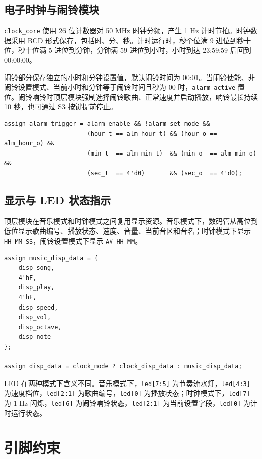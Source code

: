 \documentclass[UTF8,a4paper,12pt]{ctexart}
\begin{document}
\subsection{电子时钟与闹铃模块}

\verb|clock_core| 使用 26 位计数器对 50 MHz 时钟分频，产生 1 Hz 计时节拍。时钟数据采用 BCD 形式保存，包括时、分、秒。计时运行时，秒个位满 9 进位到秒十位，秒十位满 5 进位到分钟，分钟满 59 进位到小时，小时到达 23:59:59 后回到 00:00:00。

闹铃部分保存独立的小时和分钟设置值，默认闹铃时间为 00:01。当闹铃使能、非闹铃设置模式、当前小时和分钟等于闹铃时间且秒为 00 时，\verb|alarm_active| 置位。闹铃响铃时顶层模块强制选择闹铃歌曲、正常速度并启动播放，响铃最长持续 10 秒，也可通过 S3 按键提前停止。

\begin{lstlisting}[style=svstyle,caption={闹铃触发条件}]
assign alarm_trigger = alarm_enable && !alarm_set_mode &&
                       (hour_t == alm_hour_t) && (hour_o == alm_hour_o) &&
                       (min_t  == alm_min_t)  && (min_o  == alm_min_o)  &&
                       (sec_t  == 4'd0)       && (sec_o  == 4'd0);
\end{lstlisting}

\subsection{显示与 LED 状态指示}

顶层模块在音乐模式和时钟模式之间复用显示资源。音乐模式下，数码管从高位到低位显示歌曲编号、播放状态、速度、音量、当前音区和音名；时钟模式下显示 \verb|HH-MM-SS|，闹铃设置模式下显示 \verb|A#-HH-MM|。

\begin{lstlisting}[style=svstyle,caption={数码管显示数据选择}]
assign music_disp_data = {
    disp_song,
    4'hF,
    disp_play,
    4'hF,
    disp_speed,
    disp_vol,
    disp_octave,
    disp_note
};

assign disp_data = clock_mode ? clock_disp_data : music_disp_data;
\end{lstlisting}

LED 在两种模式下含义不同。音乐模式下，\verb|led[7:5]| 为节奏流水灯，\verb|led[4:3]| 为速度档位，\verb|led[2:1]| 为歌曲编号，\verb|led[0]| 为播放状态；时钟模式下，\verb|led[7]| 为 1 Hz 闪烁，\verb|led[6]| 为闹铃响铃状态，\verb|led[2:1]| 为当前设置字段，\verb|led[0]| 为计时运行状态。

\section{引脚约束}
\end{document}
